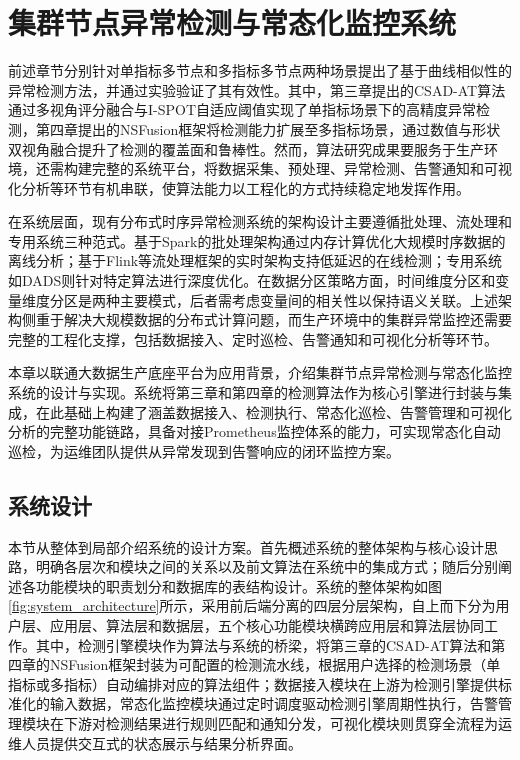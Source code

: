 \chapter{集群节点异常检测与常态化监控系统}\label{chap:system}

前述章节分别针对单指标多节点和多指标多节点两种场景提出了基于曲线相似性的异常检测方法，并通过实验验证了其有效性。其中，第三章提出的CSAD-AT算法通过多视角评分融合与I-SPOT自适应阈值实现了单指标场景下的高精度异常检测，第四章提出的NSFusion框架将检测能力扩展至多指标场景，通过数值与形状双视角融合提升了检测的覆盖面和鲁棒性。然而，算法研究成果要服务于生产环境，还需构建完整的系统平台，将数据采集、预处理、异常检测、告警通知和可视化分析等环节有机串联，使算法能力以工程化的方式持续稳定地发挥作用。

在系统层面，现有分布式时序异常检测系统的架构设计主要遵循批处理、流处理和专用系统三种范式。基于Spark的批处理架构通过内存计算优化大规模时序数据的离线分析\cite{fan2015spark}；基于Flink等流处理框架的实时架构支持低延迟的在线检测；专用系统如DADS\cite{boniol2022dads}则针对特定算法进行深度优化。在数据分区策略方面，时间维度分区和变量维度分区是两种主要模式，后者需考虑变量间的相关性以保持语义关联。上述架构侧重于解决大规模数据的分布式计算问题，而生产环境中的集群异常监控还需要完整的工程化支撑，包括数据接入、定时巡检、告警通知和可视化分析等环节。

本章以联通大数据生产底座平台为应用背景，介绍集群节点异常检测与常态化监控系统的设计与实现。系统将第三章和第四章的检测算法作为核心引擎进行封装与集成，在此基础上构建了涵盖数据接入、检测执行、常态化巡检、告警管理和可视化分析的完整功能链路，具备对接Prometheus监控体系的能力，可实现常态化自动巡检，为运维团队提供从异常发现到告警响应的闭环监控方案。

\section{系统设计}

本节从整体到局部介绍系统的设计方案。首先概述系统的整体架构与核心设计思路，明确各层次和模块之间的关系以及前文算法在系统中的集成方式；随后分别阐述各功能模块的职责划分和数据库的表结构设计。系统的整体架构如图\ref{fig:system_architecture}所示，采用前后端分离的四层分层架构，自上而下分为用户层、应用层、算法层和数据层，五个核心功能模块横跨应用层和算法层协同工作。其中，检测引擎模块作为算法与系统的桥梁，将第三章的CSAD-AT算法和第四章的NSFusion框架封装为可配置的检测流水线，根据用户选择的检测场景（单指标或多指标）自动编排对应的算法组件；数据接入模块在上游为检测引擎提供标准化的输入数据，常态化监控模块通过定时调度驱动检测引擎周期性执行，告警管理模块在下游对检测结果进行规则匹配和通知分发，可视化模块则贯穿全流程为运维人员提供交互式的状态展示与结果分析界面。

